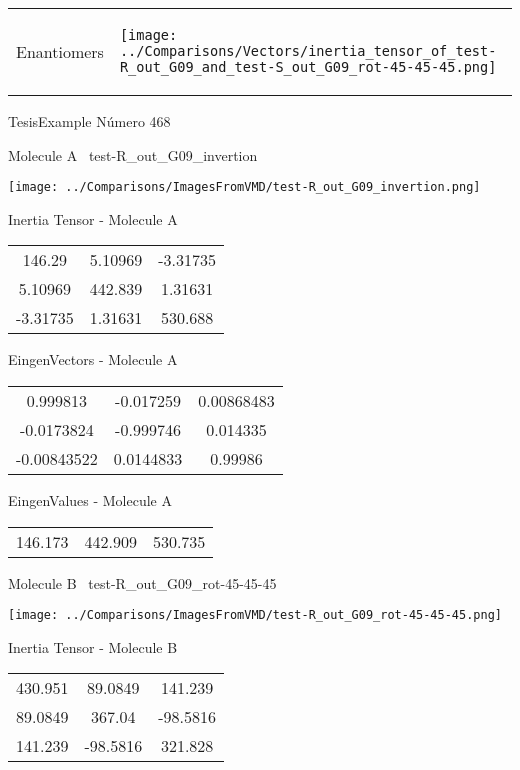 \vtab[-5mm]
\begin{tabular}{*{2}{m{}}}
\begin{center}
\textcolor{NavyBlue}{\Large Enantiomers}
\end{center}
&
\begin{center}
\texttt{[image: ../Comparisons/Vectors/inertia\_tensor\_of\_test-R\_out\_G09\_and\_test-S\_out\_G09\_rot-45-45-45.png]}
\end{center}
\end{tabular}

 \newpage

\vtab[-3cm]
\begin{center}
{\large TesisExample \tab Número 468}
\end{center}
\begin{multicols}{2}
\begin{center}

Molecule A \
test-R\_out\_G09\_invertion

\texttt{[image: ../Comparisons/ImagesFromVMD/test-R\_out\_G09\_invertion.png]}

Inertia Tensor - Molecule A \\
\begin{tabular}{|c c c|}
146.29	 & 	5.10969	 & 	-3.31735	 \\
5.10969	 & 	442.839	 & 	1.31631	 \\
-3.31735	 & 	1.31631	 & 	530.688
\end{tabular}

\vtab
 EingenVectors - Molecule A     \\
\begin{tabular}{|c c c|}
0.999813	 & 	-0.017259	 & 	0.00868483	 \\
-0.0173824	 & 	-0.999746	 & 	0.014335	 \\
-0.00843522	 & 	0.0144833	 & 	0.99986
\end{tabular}

\vtab
 EingenValues - Molecule A     \\
\begin{tabular}{|c c c|}
146.173	 & 	442.909	 & 	530.735	 \\
\end{tabular}
\columnbreak

Molecule B \
test-R\_out\_G09\_rot-45-45-45

\texttt{[image: ../Comparisons/ImagesFromVMD/test-R\_out\_G09\_rot-45-45-45.png]}

Inertia Tensor - Molecule B \\
\begin{tabular}{|c c c|}
430.951	 & 	89.0849	 & 	141.239	 \\
89.0849	 & 	367.04	 & 	-98.5816	 \\
141.239	 & 	-98.5816	 & 	321.828
\end{tabular}


\end{center}
\end{multicols}

